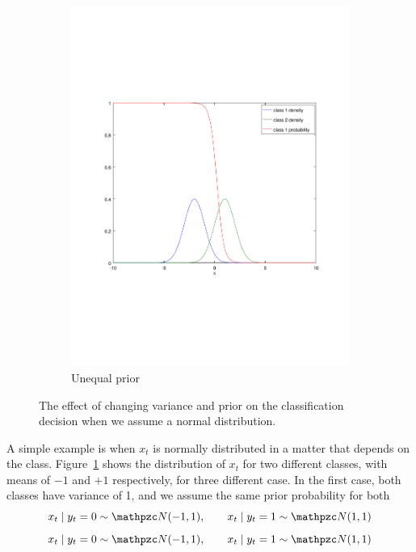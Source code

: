 \begin{frame}
\begin{figure}[H]
\begin{subfigure}{\fwidth}
      \includegraphics[width=\textwidth]{../figures/unequal-prior}
      \caption{Unequal prior}
    \end{subfigure}
    \caption{The effect of changing variance and prior on the classification decision when we assume a normal distribution.}
    \label{fig:normal-generative}
  \end{figure}
  \begin{example}
    A simple example is when $x_t$ is normally distributed in a matter that depends on the class.  Figure~\ref{fig:normal-generative} shows the distribution of $x_t$ for two different classes, with means of $-1$ and $+1$ respectively, for three different case. In the first case, both classes have variance of 1, and we assume the same prior probability for both
    \[
    x_t \mid y_t = 0 \sim \Normal(-1,1),
    \qquad
    x_t \mid y_t = 1 \sim \Normal(1,1)
    \]
    \[
    x_t \mid y_t = 0 \sim \Normal(-1,1),
    \qquad
    x_t \mid y_t = 1 \sim \Normal(1,1)
    \]

  \end{example}
  
\end{frame}


